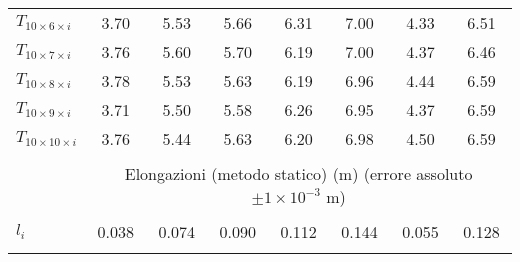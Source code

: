 \begin{table*}[t!]
\begin{tabular}{l*{7}{c}}
        $T_{10\times6 \times i}$ & 3.70     & 5.53     & 5.66     & 6.31     & 7.00     & 4.33     & 6.51                                       \\[+0.5ex]
        $T_{10\times7 \times i}$ & 3.76     & 5.60     & 5.70     & 6.19     & 7.00     & 4.37     & 6.46                                       \\[+0.5ex]
        $T_{10\times8 \times i}$ & 3.78     & 5.53     & 5.63     & 6.19     & 6.96     & 4.44     & 6.59                                       \\[+0.5ex]
        $T_{10\times9 \times i}$ & 3.71     & 5.50     & 5.58     & 6.26     & 6.95     & 4.37     & 6.59                                       \\[+0.5ex]
        $T_{10\times10\times i}$ & 3.76     & 5.44     & 5.63     & 6.20     & 6.98     & 4.50     & 6.59                                       \\[+0.5ex] \hline \\[-1.5ex]
                                 & \multicolumn{7}{c}{Elongazioni (metodo statico) (m) (errore assoluto $\pm1\times10^{-3}$ m)}                 \\[+0.5ex] \hline \\[-1.5ex]
        $l_i$                    & 0.038    & 0.074    & 0.090    & 0.112    & 0.144    & 0.055    & 0.128                                      \\[+0.5ex]
        \hline \\[-1.5ex]
    \end{tabular}
\end{table*}
